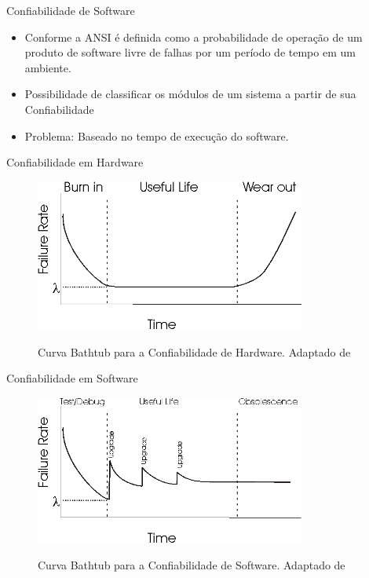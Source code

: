 \documentclass[t,14pt,mathserif]{beamer}
\begin{document}
\begin{frame}{Confiabilidade de Software}

	\begin{itemize}
		\item Conforme a ANSI é definida como a probabilidade de operação de um produto de software livre de falhas por um período de tempo em um ambiente.
		\item Possibilidade de classificar os módulos de um sistema a partir de sua \alert{Confiabilidade}
		\item \alert{Problema:} Baseado no tempo de execução do software.
	\end{itemize}


\end{frame}
\begin{frame}{Confiabilidade em Hardware}

	\begin{figure}[!t]
		\centering
		\includegraphics[width=3.5in]{../img/bath_curve.png}
		\label{fig:bath_curve}
		\caption{Curva Bathtub para a Confiabilidade de Hardware. Adaptado de \cite{Lyu:1996}}
	\end{figure}


\end{frame}


\begin{frame}{Confiabilidade em Software}

	\begin{figure}[!t]
		\centering
		\includegraphics[width=3.5in]{../img/bath_curve_sw.png}
		\label{fig:bath_curve}
		\caption{Curva Bathtub para a Confiabilidade de Software. Adaptado de \cite{Lyu:1996}}
	\end{figure}


\end{frame}
\end{document}
